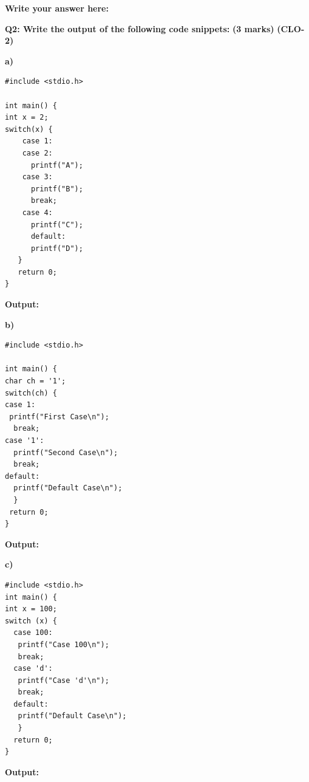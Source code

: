 \documentclass[a4paper,12pt]{article}
\begin{document}
\textbf{Write your answer here:}
\begin{tcolorbox}[colframe=black, colback=white, width=\textwidth, height=23cm, valign=center]
\end{tcolorbox}

\vspace{1.5cm}

\textbf{Q2: Write the output of the following code snippets:} \hfill \textbf{(3 marks)} \textbf{(CLO-2)}

\begin{center}
\begin{minipage}[t]{0.3\textwidth}
\textbf{a)}
\begin{verbatim}
#include <stdio.h>

int main() {
int x = 2;
switch(x) {
    case 1:
    case 2:
      printf("A");
    case 3:
      printf("B");
      break;
    case 4:
      printf("C");
      default:
      printf("D");
   }
   return 0;
}
\end{verbatim}

\textbf{Output:}
\begin{tcolorbox}[colframe=black, colback=white, width=\textwidth, height=2cm, valign=center]

\end{tcolorbox}
\end{minipage}
\hfill
\begin{minipage}[t]{0.3\textwidth}
\textbf{b)}
\begin{verbatim}
#include <stdio.h>

int main() {
char ch = '1';
switch(ch) {
case 1:
 printf("First Case\n");
  break;
case '1':
  printf("Second Case\n");
  break;
default:
  printf("Default Case\n");
  }
 return 0;
}
\end{verbatim}
\vspace{1cm}
\textbf{Output:}
\begin{tcolorbox}[colframe=black, colback=white, width=\textwidth, height=2cm, valign=center]
\end{tcolorbox}
\end{minipage}
\hfill
\begin{minipage}[t]{0.3\textwidth}
\textbf{c)}
\begin{verbatim}
#include <stdio.h>
int main() {
int x = 100;
switch (x) {
  case 100:
   printf("Case 100\n");
   break;
  case 'd':
   printf("Case 'd'\n");
   break;
  default:
   printf("Default Case\n");
   }
  return 0;
}
\end{verbatim}
\vspace{1.5cm}
\textbf{Output:}
\begin{tcolorbox}[colframe=black, colback=white, width=\textwidth, height=2cm, valign=center]
\end{tcolorbox}
\end{minipage}
\end{center}



\end{document}
